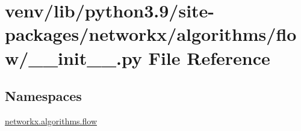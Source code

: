\hypertarget{venv_2lib_2python3_89_2site-packages_2networkx_2algorithms_2flow_2____init_____8py}{}\section{venv/lib/python3.9/site-\/packages/networkx/algorithms/flow/\+\_\+\+\_\+init\+\_\+\+\_\+.py File Reference}
\label{venv_2lib_2python3_89_2site-packages_2networkx_2algorithms_2flow_2____init_____8py}
\subsection*{Namespaces}
\begin{DoxyCompactItemize}
\item 
 \hyperlink{namespacenetworkx_1_1algorithms_1_1flow}{networkx.\+algorithms.\+flow}
\end{DoxyCompactItemize}
